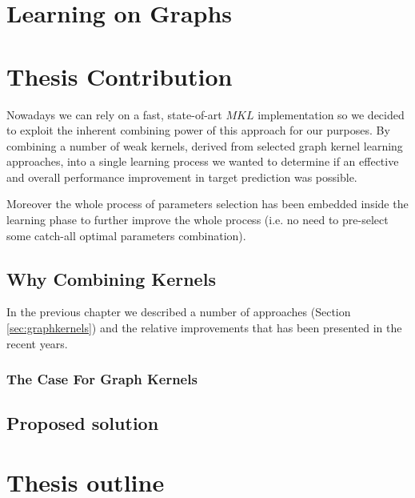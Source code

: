 \section{Learning on Graphs}


\section{Thesis Contribution}

Nowadays we can rely on a fast, state-of-art $MKL$ implementation \cite{easymkl}
so we decided to exploit the inherent combining power of this approach for our
purposes.
By combining a number of weak kernels, derived from selected graph kernel
learning approaches, into a single learning process we wanted to determine if an
effective and overall performance improvement in target prediction was possible.

Moreover the whole process of parameters selection has been embedded inside the
learning phase to further improve the whole process (i.e. no need to pre-select
some catch-all optimal parameters combination).

\subsection{Why Combining Kernels}
\label{sec:why}

In the previous chapter we described a number of approaches (Section \ref{sec:graphkernels})
and the relative improvements that has been presented in the recent years.

\subsubsection{The Case For Graph Kernels}

\subsection{Proposed solution}


\section{Thesis outline}


